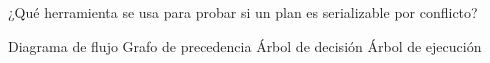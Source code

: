 \question[1] ¿Qué herramienta se usa para probar si un plan es serializable por conflicto?
\begin{choices}
\choice Diagrama de flujo
\CorrectChoice Grafo de precedencia
\choice Árbol de decisión
\choice Árbol de ejecución
\end{choices}
